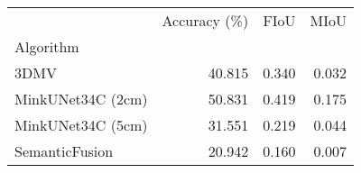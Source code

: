 \begin{tabular}{lrrr}
\toprule
{} &  Accuracy (\%) &  FIoU &  MIoU \\
Algorithm          &               &       &       \\
\midrule
3DMV              &        40.815 & 0.340 & 0.032 \\
MinkUNet34C (2cm) &        50.831 & 0.419 & 0.175 \\
MinkUNet34C (5cm) &        31.551 & 0.219 & 0.044 \\
SemanticFusion    &        20.942 & 0.160 & 0.007 \\
\bottomrule
\end{tabular}
